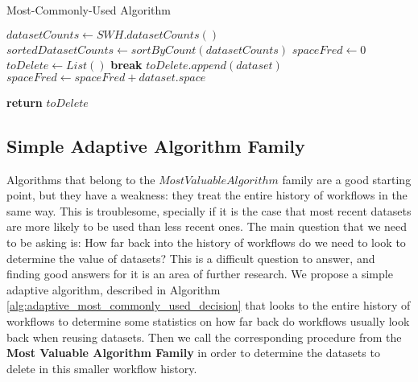 \begin{algorithm}
\begin{singlespace}
\caption{Most-Commonly-Used Algorithm}
\label{alg:most_commonly_used_decision}
\begin{algorithmic}[1]
	\State $datasetCounts \gets SWH.datasetCounts()$
	\State $sortedDatasetCounts \gets sortByCount(datasetCounts)$
	\State $spaceFred \gets 0$
	\State $toDelete \gets List()$
			\State \textbf{break}
		\EndIf	
		\State $toDelete.append(dataset)$
		\State $spaceFred \gets spaceFred + dataset.space$
	\EndFor
	
	\State \textbf{return} $toDelete$
\EndProcedure
\end{algorithmic}
\end{singlespace}
\end{algorithm}

\subsection{Simple Adaptive Algorithm Family}
Algorithms that belong to the $Most Valuable Algorithm$ family are a good starting point, but they have a weakness: they treat the entire history of workflows in the same way.  This is troublesome, specially if it is the case that most recent datasets are more likely to be used than less recent ones.  The main question that we need to be asking is: How far back into the history of workflows do we need to look to determine the value of datasets? This is a difficult question to answer, and finding good answers for it is an area of further research.  We propose a simple adaptive algorithm, described in Algorithm \ref{alg:adaptive_most_commonly_used_decision} that looks to the entire history of workflows to determine some statistics on how far back do workflows usually look back when reusing datasets. Then we call the corresponding procedure from the \textbf{Most Valuable Algorithm Family} in order to determine the datasets to delete in this smaller workflow history.

